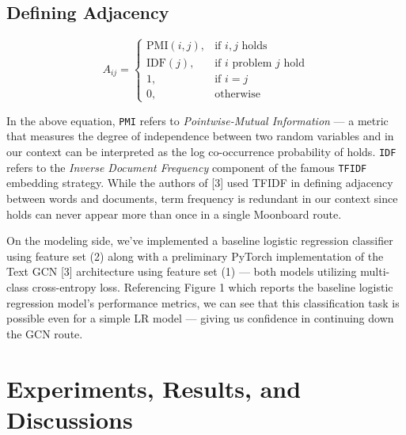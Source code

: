 \documentclass{article}
\begin{document}
\subsection{Defining Adjacency}

\begin{equation}
A_{ij}= 
\begin{cases}
    \text{PMI}(i, j), & \text{if } i, j \text{ holds} \\
    \text{IDF}(j), & \text{if } i \text{ problem } j \text{ hold} \\
    1, & \text{if } i=j \\
    0, & \text{otherwise}
\end{cases}
\end{equation}

In the above equation, \texttt{PMI} refers to \textit{Pointwise-Mutual Information} --- a metric that measures the degree of independence between two random variables and in our context can be interpreted as the log co-occurrence probability of holds. \texttt{IDF} refers to the \textit{Inverse Document Frequency} component of the famous \texttt{TFIDF} embedding strategy. While the authors of [3] used TFIDF in defining adjacency between words and documents, term frequency is redundant in our context since holds can never appear more than once in a single Moonboard route.

On the modeling side, we've implemented a baseline logistic regression classifier using feature set (2) along with a preliminary PyTorch implementation of the Text GCN [3] architecture using feature set (1) --- both models utilizing multi-class cross-entropy loss. Referencing Figure 1 which reports the baseline logistic regression model's performance metrics, we can see that this classification task is possible even for a simple LR model --- giving us confidence in continuing down the GCN route.

\section{Experiments, Results, and Discussions}
\end{document}
